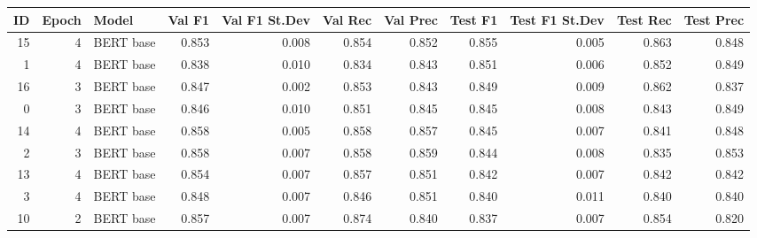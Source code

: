 \begin{tabular}{rrlrrrrrrrr}
\toprule
 ID &  Epoch &     Model &  Val F1 &  Val F1 St.Dev &  Val Rec &  Val Prec &  Test F1 &  Test F1 St.Dev &  Test Rec &  Test Prec \\
\midrule
 15 &      4 & BERT base &   0.853 &          0.008 &    0.854 &     0.852 &    0.855 &           0.005 &     0.863 &      0.848 \\
  1 &      4 & BERT base &   0.838 &          0.010 &    0.834 &     0.843 &    0.851 &           0.006 &     0.852 &      0.849 \\
 16 &      3 & BERT base &   0.847 &          0.002 &    0.853 &     0.843 &    0.849 &           0.009 &     0.862 &      0.837 \\
  0 &      3 & BERT base &   0.846 &          0.010 &    0.851 &     0.845 &    0.845 &           0.008 &     0.843 &      0.849 \\
 14 &      4 & BERT base &   0.858 &          0.005 &    0.858 &     0.857 &    0.845 &           0.007 &     0.841 &      0.848 \\
  2 &      3 & BERT base &   0.858 &          0.007 &    0.858 &     0.859 &    0.844 &           0.008 &     0.835 &      0.853 \\
 13 &      4 & BERT base &   0.854 &          0.007 &    0.857 &     0.851 &    0.842 &           0.007 &     0.842 &      0.842 \\
  3 &      4 & BERT base &   0.848 &          0.007 &    0.846 &     0.851 &    0.840 &           0.011 &     0.840 &      0.840 \\
 10 &      2 & BERT base &   0.857 &          0.007 &    0.874 &     0.840 &    0.837 &           0.007 &     0.854 &      0.820 \\
\hline
\end{tabular}
